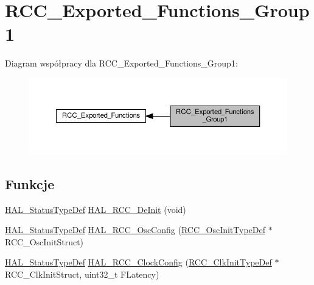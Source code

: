 \hypertarget{group___r_c_c___exported___functions___group1}{}\section{R\+C\+C\+\_\+\+Exported\+\_\+\+Functions\+\_\+\+Group1}
\label{group___r_c_c___exported___functions___group1}
Diagram współpracy dla R\+C\+C\+\_\+\+Exported\+\_\+\+Functions\+\_\+\+Group1\+:\nopagebreak
\begin{figure}[H]
\begin{center}
\leavevmode
\includegraphics[width=350pt]{group___r_c_c___exported___functions___group1}
\end{center}
\end{figure}
\subsection*{Funkcje}
\begin{DoxyCompactItemize}
\item 
\hyperlink{stm32f4xx__hal__def_8h_a63c0679d1cb8b8c684fbb0632743478f}{H\+A\+L\+\_\+\+Status\+Type\+Def} \hyperlink{group___r_c_c___exported___functions___group1_ga064f7d9878ecdc1d4852cba2b9e6a52e}{H\+A\+L\+\_\+\+R\+C\+C\+\_\+\+De\+Init} (void)
\item 
\hyperlink{stm32f4xx__hal__def_8h_a63c0679d1cb8b8c684fbb0632743478f}{H\+A\+L\+\_\+\+Status\+Type\+Def} \hyperlink{group___r_c_c___exported___functions___group1_ga9c504088722e03830df6caad932ad06b}{H\+A\+L\+\_\+\+R\+C\+C\+\_\+\+Osc\+Config} (\hyperlink{struct_r_c_c___osc_init_type_def}{R\+C\+C\+\_\+\+Osc\+Init\+Type\+Def} $\ast$R\+C\+C\+\_\+\+Osc\+Init\+Struct)
\item 
\hyperlink{stm32f4xx__hal__def_8h_a63c0679d1cb8b8c684fbb0632743478f}{H\+A\+L\+\_\+\+Status\+Type\+Def} \hyperlink{group___r_c_c___exported___functions___group1_gad0a4b5c7459219fafc15f3f867563ef3}{H\+A\+L\+\_\+\+R\+C\+C\+\_\+\+Clock\+Config} (\hyperlink{struct_r_c_c___clk_init_type_def}{R\+C\+C\+\_\+\+Clk\+Init\+Type\+Def} $\ast$R\+C\+C\+\_\+\+Clk\+Init\+Struct, uint32\+\_\+t F\+Latency)
\end{DoxyCompactItemize}


